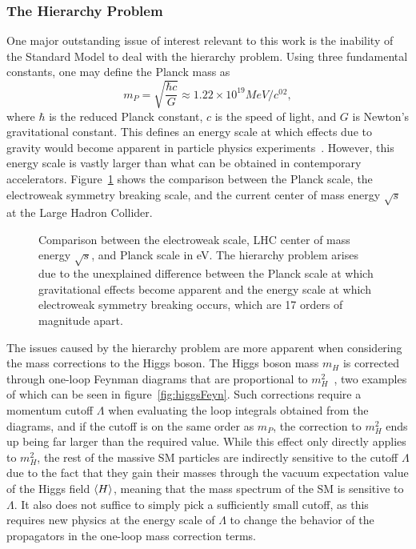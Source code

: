 \subsubsection{The Hierarchy Problem}

One major outstanding issue of interest relevant to this work is the inability of the Standard Model to deal with the hierarchy problem.
Using three fundamental constants, one may define the Planck mass as
\begin{equation}
  m_P=\sqrt{\frac{\hbar c}{G}}\approx1.22\times10^{19}\unit{MeV/\clight^2},
\end{equation}
where $\hbar$ is the reduced Planck constant, $c$ is the speed of light, and $G$ is Newton's gravitational constant.
This defines an energy scale at which effects due to gravity would become apparent in particle physics experiments~\cite{QFTNutshell}.
However, this energy scale is vastly larger than what can be obtained in contemporary accelerators.
Figure~\ref{fig:hierarchy} shows the comparison between the Planck scale, the electroweak symmetry breaking scale, and the current center of mass energy $\sqrt{s}$ at the Large Hadron Collider.

\begin{figure}[htbp]
  \centering
  
  \caption{
    Comparison between the electroweak scale, LHC center of mass energy $\sqrt{s}$, and Planck scale in eV.
    The hierarchy problem arises due to the unexplained difference between the Planck scale at which gravitational effects become apparent and the energy scale at which electroweak symmetry breaking occurs, which are 17 orders of magnitude apart.
  }
  \label{fig:hierarchy}
\end{figure}

The issues caused by the hierarchy problem are more apparent when considering the mass corrections to the Higgs boson.
The Higgs boson mass $m_H$ is corrected through one-loop Feynman diagrams that are proportional to $m_H^2$~\cite{Martin_1998}, two examples of which can be seen in figure~\ref{fig:higgsFeyn}.
Such corrections require a momentum cutoff $\Lambda$ when evaluating the loop integrals obtained from the diagrams, and if the cutoff is on the same order as $m_P$, the correction to $m_H^2$ ends up being far larger than the required value.
While this effect only directly applies to $m_H^2$, the rest of the massive SM particles are indirectly sensitive to the cutoff $\Lambda$ due to the fact that they gain their masses through the vacuum expectation value of the Higgs field $\ev{H}$, meaning that the mass spectrum of the SM is sensitive to $\Lambda$.
It also does not suffice to simply pick a sufficiently small cutoff, as this requires new physics at the energy scale of $\Lambda$ to change the behavior of the propagators in the one-loop mass correction terms.

